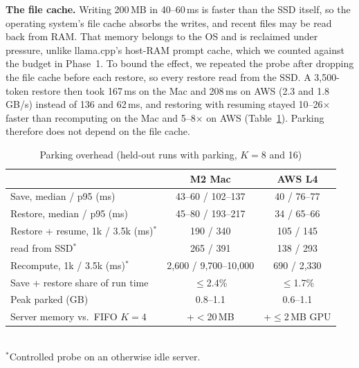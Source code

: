 \documentclass[conference,letterpaper]{IEEEtran}
\begin{document}
\textbf{The file cache.} Writing 200\,MB in 40--60\,ms is faster than the SSD itself, so the operating system's file cache absorbs the writes, and recent files may be read back from RAM. That memory belongs to the OS and is reclaimed under pressure, unlike llama.cpp's host-RAM prompt cache, which we counted against the budget in Phase~1. To bound the effect, we repeated the probe after dropping the file cache before each restore, so every restore read from the SSD. A 3,500-token restore then took 167\,ms on the Mac and 208\,ms on AWS (2.3 and 1.8\,GB/s) instead of 136 and 62\,ms, and restoring with resuming stayed 10--26$\times$ faster than recomputing on the Mac and 5--8$\times$ on AWS (Table~\ref{tab:overhead}). Parking therefore does not depend on the file cache.

\begin{table}[t]
\caption{Parking overhead (held-out runs with parking, $K=8$ and 16)}
\label{tab:overhead}
\centering\footnotesize\setlength{\tabcolsep}{3pt}
\begin{tabular}{@{}lcc@{}}
\toprule
 & M2 Mac & AWS L4 \\
\midrule
Save, median / p95 (ms) & 43--60 / 102--137 & 40 / 76--77 \\
Restore, median / p95 (ms) & 45--80 / 193--217 & 34 / 65--66 \\
Restore + resume, 1k / 3.5k (ms)$^\ast$ & 190 / 340 & 105 / 145 \\
\quad read from SSD$^\ast$ & 265 / 391 & 138 / 293 \\
Recompute, 1k / 3.5k (ms)$^\ast$ & 2,600 / 9,700--10,000 & 690 / 2,330 \\
Save + restore share of run time & $\le$2.4\% & $\le$1.7\% \\
Peak parked (GB) & 0.8--1.1 & 0.6--1.1 \\
Server memory vs.\ FIFO $K=4$ & +$<$20\,MB & +$\le$2\,MB GPU \\
\bottomrule
\end{tabular}\\[2pt]
{\scriptsize $^\ast$Controlled probe on an otherwise idle server.}
\end{table}
\end{document}

